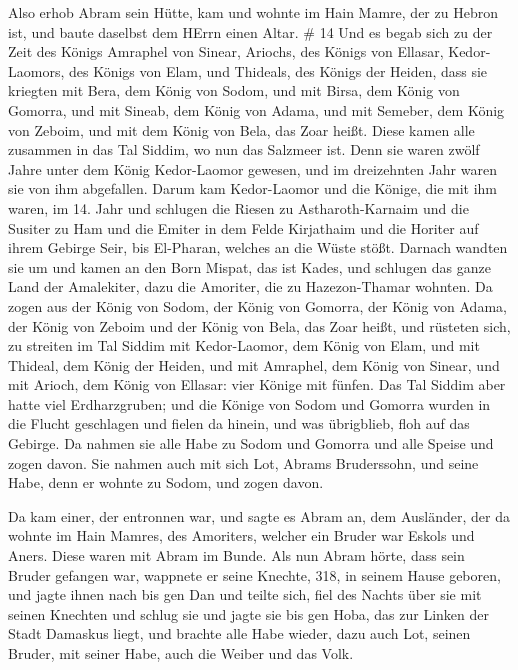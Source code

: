  Also erhob Abram sein Hütte, kam und wohnte im Hain Mamre,
der zu Hebron ist, und baute daselbst dem HErrn einen Altar. \# 14
 Und es begab sich zu der Zeit des Königs Amraphel von
Sinear, Ariochs, des Königs von Ellasar, Kedor-Laomors, des Königs von
Elam, und Thideals, des Königs der Heiden,  dass sie
kriegten mit Bera, dem König von Sodom, und mit Birsa, dem König von
Gomorra, und mit Sineab, dem König von Adama, und mit Semeber, dem König
von Zeboim, und mit dem König von Bela, das Zoar heißt. 
Diese kamen alle zusammen in das Tal Siddim, wo nun das Salzmeer ist.
 Denn sie waren zwölf Jahre unter dem König Kedor-Laomor
gewesen, und im dreizehnten Jahr waren sie von ihm abgefallen.
 Darum kam Kedor-Laomor und die Könige, die mit ihm waren,
im 14. Jahr und schlugen die Riesen zu Astharoth-Karnaim und die Susiter
zu Ham und die Emiter in dem Felde Kirjathaim  und die
Horiter auf ihrem Gebirge Seir, bis El-Pharan, welches an die Wüste
stößt.  Darnach wandten sie um und kamen an den Born Mispat,
das ist Kades, und schlugen das ganze Land der Amalekiter, dazu die
Amoriter, die zu Hazezon-Thamar wohnten.  Da zogen aus der
König von Sodom, der König von Gomorra, der König von Adama, der König
von Zeboim und der König von Bela, das Zoar heißt, und rüsteten sich, zu
streiten im Tal Siddim  mit Kedor-Laomor, dem König von
Elam, und mit Thideal, dem König der Heiden, und mit Amraphel, dem König
von Sinear, und mit Arioch, dem König von Ellasar: vier Könige mit
fünfen.  Das Tal Siddim aber hatte viel Erdharzgruben; und
die Könige von Sodom und Gomorra wurden in die Flucht geschlagen und
fielen da hinein, und was übrigblieb, floh auf das Gebirge.
 Da nahmen sie alle Habe zu Sodom und Gomorra und alle
Speise und zogen davon.  Sie nahmen auch mit sich Lot,
Abrams Bruderssohn, und seine Habe, denn er wohnte zu Sodom, und zogen
davon.

 Da kam einer, der entronnen war, und sagte es Abram an,
dem Ausländer, der da wohnte im Hain Mamres, des Amoriters, welcher ein
Bruder war Eskols und Aners. Diese waren mit Abram im Bunde.
 Als nun Abram hörte, dass sein Bruder gefangen war,
wappnete er seine Knechte, 318, in seinem Hause geboren, und jagte ihnen
nach bis gen Dan  und teilte sich, fiel des Nachts über sie
mit seinen Knechten und schlug sie und jagte sie bis gen Hoba, das zur
Linken der Stadt Damaskus liegt,  und brachte alle Habe
wieder, dazu auch Lot, seinen Bruder, mit seiner Habe, auch die Weiber
und das Volk.

